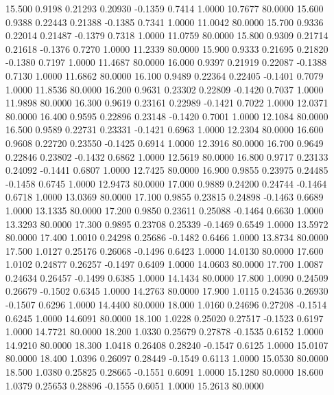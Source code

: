   15.500   0.9198   0.21293   0.20930  -0.1359   0.7414   1.0000  10.7677  80.0000
  15.600   0.9388   0.22443   0.21388  -0.1385   0.7341   1.0000  11.0042  80.0000
  15.700   0.9336   0.22014   0.21487  -0.1379   0.7318   1.0000  11.0759  80.0000
  15.800   0.9309   0.21714   0.21618  -0.1376   0.7270   1.0000  11.2339  80.0000
  15.900   0.9333   0.21695   0.21820  -0.1380   0.7197   1.0000  11.4687  80.0000
  16.000   0.9397   0.21919   0.22087  -0.1388   0.7130   1.0000  11.6862  80.0000
  16.100   0.9489   0.22364   0.22405  -0.1401   0.7079   1.0000  11.8536  80.0000
  16.200   0.9631   0.23302   0.22809  -0.1420   0.7037   1.0000  11.9898  80.0000
  16.300   0.9619   0.23161   0.22989  -0.1421   0.7022   1.0000  12.0371  80.0000
  16.400   0.9595   0.22896   0.23148  -0.1420   0.7001   1.0000  12.1084  80.0000
  16.500   0.9589   0.22731   0.23331  -0.1421   0.6963   1.0000  12.2304  80.0000
  16.600   0.9608   0.22720   0.23550  -0.1425   0.6914   1.0000  12.3916  80.0000
  16.700   0.9649   0.22846   0.23802  -0.1432   0.6862   1.0000  12.5619  80.0000
  16.800   0.9717   0.23133   0.24092  -0.1441   0.6807   1.0000  12.7425  80.0000
  16.900   0.9855   0.23975   0.24485  -0.1458   0.6745   1.0000  12.9473  80.0000
  17.000   0.9889   0.24200   0.24744  -0.1464   0.6718   1.0000  13.0369  80.0000
  17.100   0.9855   0.23815   0.24898  -0.1463   0.6689   1.0000  13.1335  80.0000
  17.200   0.9850   0.23611   0.25088  -0.1464   0.6630   1.0000  13.3293  80.0000
  17.300   0.9895   0.23708   0.25339  -0.1469   0.6549   1.0000  13.5972  80.0000
  17.400   1.0010   0.24298   0.25686  -0.1482   0.6466   1.0000  13.8734  80.0000
  17.500   1.0127   0.25176   0.26068  -0.1496   0.6423   1.0000  14.0130  80.0000
  17.600   1.0102   0.24877   0.26257  -0.1497   0.6409   1.0000  14.0603  80.0000
  17.700   1.0087   0.24634   0.26457  -0.1499   0.6385   1.0000  14.1434  80.0000
  17.800   1.0090   0.24509   0.26679  -0.1502   0.6345   1.0000  14.2763  80.0000
  17.900   1.0115   0.24536   0.26930  -0.1507   0.6296   1.0000  14.4400  80.0000
  18.000   1.0160   0.24696   0.27208  -0.1514   0.6245   1.0000  14.6091  80.0000
  18.100   1.0228   0.25020   0.27517  -0.1523   0.6197   1.0000  14.7721  80.0000
  18.200   1.0330   0.25679   0.27878  -0.1535   0.6152   1.0000  14.9210  80.0000
  18.300   1.0418   0.26408   0.28240  -0.1547   0.6125   1.0000  15.0107  80.0000
  18.400   1.0396   0.26097   0.28449  -0.1549   0.6113   1.0000  15.0530  80.0000
  18.500   1.0380   0.25825   0.28665  -0.1551   0.6091   1.0000  15.1280  80.0000
  18.600   1.0379   0.25653   0.28896  -0.1555   0.6051   1.0000  15.2613  80.0000
